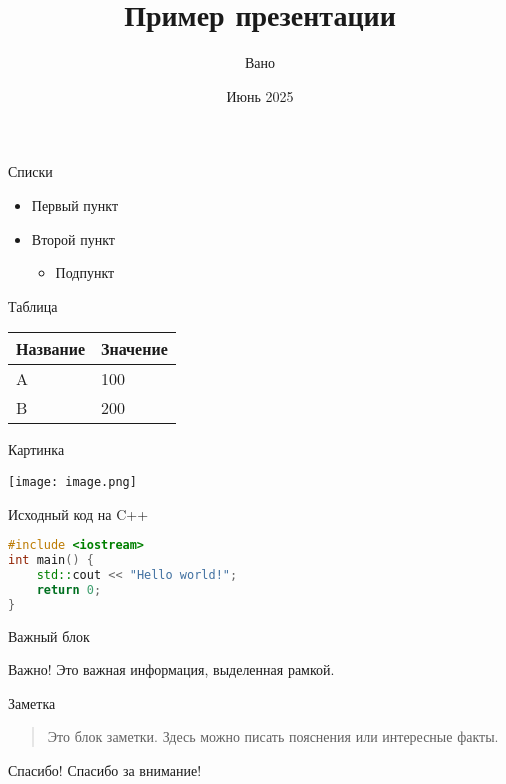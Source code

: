 \documentclass{beamer}
\title{Пример презентации}
\author{Вано}
\institute{Университет Технологий}
\date{Июнь 2025}
\begin{document}
\begin{frame}
  \titlepage
\end{frame}

\begin{frame}{Списки}
\begin{itemize}
  \item Первый пункт
  \item Второй пункт
  \begin{itemize}
    \item Подпункт
  \end{itemize}
\end{itemize}
\end{frame}

\begin{frame}{Таблица}
\begin{tabular}{@{}ll@{}}
\toprule
Название & Значение \\
\midrule
A        & 100      \\
B        & 200      \\
\bottomrule
\end{tabular}
\end{frame}

\begin{frame}{Картинка}
\begin{center}
  \texttt{[image: image.png]}
\end{center}
\end{frame}

\begin{frame}[fragile]{Исходный код на C++}
\begin{lstlisting}[language=C++]
#include <iostream>
int main() {
    std::cout << "Hello world!";
    return 0;
}
\end{lstlisting}
\end{frame}

\begin{frame}{Важный блок}
\begin{block}{Важно!}
Это важная информация, выделенная рамкой.
\end{block}
\end{frame}

\begin{frame}{Заметка}
\begin{quote}
Это блок заметки. Здесь можно писать пояснения или интересные факты.
\end{quote}
\end{frame}

\begin{frame}{Спасибо!}
Спасибо за внимание!
\end{frame}
\end{document}
